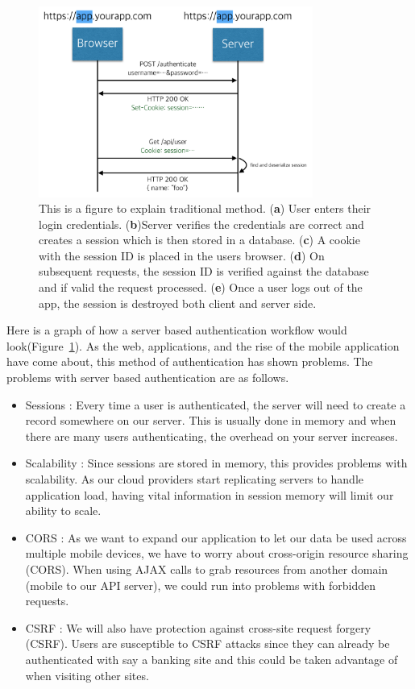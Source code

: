 \documentclass[journal,article,submit,moreauthors,pdftex,10pt,a4paper]{mdpi}
\begin{document}
\begin{figure}[H]
\centering
\includegraphics[width=9cm]{figures/traditional}
\caption{This is a figure to explain traditional method. (\textbf{a}) User enters their login credentials. (\textbf{b})Server verifies the credentials are correct and creates a session which is then stored in a database. (\textbf{c}) A cookie with the session ID is placed in the users browser. (\textbf{d}) On subsequent requests, the session ID is verified against the database and if valid the request processed. (\textbf{e}) Once a user logs out of the app, the session is destroyed both client and server side.}
\label{traditional}
\end{figure}

Here is a graph of how a server based authentication workflow would look(Figure~\ref{traditional}). As the web, applications, and the rise of the mobile application have come about, this method of authentication has shown problems\cite{authentication-mobile, attacks}.
The problems with server based authentication are as follows.
\begin{itemize}[leftmargin=*,labelsep=4mm]
\item	Sessions : Every time a user is authenticated, the server will need to create a record somewhere on our server. This is usually done in memory and when there are many users authenticating, the overhead on your server increases.
\item	Scalability : Since sessions are stored in memory, this provides problems with scalability. As our cloud providers start replicating servers to handle application load, having vital information in session memory will limit our ability to scale.
\item	CORS : As we want to expand our application to let our data be used across multiple mobile devices, we have to worry about cross-origin resource sharing (CORS). When using AJAX calls to grab resources from another domain (mobile to our API server), we could run into problems with forbidden requests.
\item	CSRF : We will also have protection against cross-site request forgery (CSRF). Users are susceptible to CSRF attacks since they can already be authenticated with say a banking site and this could be taken advantage of when visiting other sites.
\end{itemize}
\end{document}
